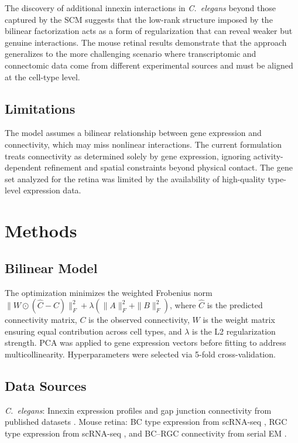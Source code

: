 \documentclass[11pt]{article}
\begin{document}
The discovery of additional innexin interactions in \textit{C.~elegans} beyond those captured by the SCM suggests that the low-rank structure imposed by the bilinear factorization acts as a form of regularization that can reveal weaker but genuine interactions. The mouse retinal results demonstrate that the approach generalizes to the more challenging scenario where transcriptomic and connectomic data come from different experimental sources and must be aligned at the cell-type level.

\subsection{Limitations}

The model assumes a bilinear relationship between gene expression and connectivity, which may miss nonlinear interactions. The current formulation treats connectivity as determined solely by gene expression, ignoring activity-dependent refinement and spatial constraints beyond physical contact. The gene set analyzed for the retina was limited by the availability of high-quality type-level expression data.

\section{Methods}

\subsection{Bilinear Model}

The optimization minimizes the weighted Frobenius norm $\|W \odot (\hat{C} - C)\|_F^2 + \lambda(\|A\|_F^2 + \|B\|_F^2)$, where $\hat{C}$ is the predicted connectivity matrix, $C$ is the observed connectivity, $W$ is the weight matrix ensuring equal contribution across cell types, and $\lambda$ is the L2 regularization strength. PCA was applied to gene expression vectors before fitting to address multicollinearity. Hyperparameters were selected via 5-fold cross-validation.

\subsection{Data Sources}

\textit{C.~elegans}: Innexin expression profiles and gap junction connectivity from published datasets \citep{cook2019whole, taylor2021molecular, brennan2019innexins}. Mouse retina: BC type expression from scRNA-seq \citep{shekhar2016comprehensive}, RGC type expression from scRNA-seq \citep{tran2019single}, and BC--RGC connectivity from serial EM \citep{helmstaedter2013connectomic, bae2018digital}.
\end{document}

